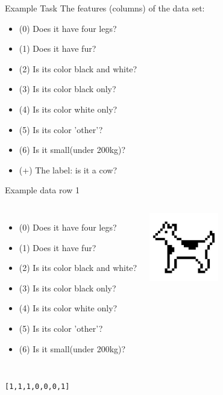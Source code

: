\documentclass[15pt]{beamer}
\begin{document}
\begin{frame}{Example Task}
    The features (columns) of the data set:
    \vspace{2mm}
    \begin{itemize}\itemsep0.5em
        \item (0) Does it have four legs?
        \item (1) Does it have fur?
        \item (2) Is its color black and white?
        \item (3) Is its color black only?
        \item (4) Is its color white only?
        \item (5) Is its color 'other'?
        \item (6) Is it small(under 200kg)?
        \item (+) The label: is it a cow?
    \end{itemize}
\end{frame}


\begin{frame}{Example data row 1}
    \begin{columns}[b]
        \small
        \begin{itemize}\itemsep0.25em
            \item (0) Does it have four legs?
            \item (1) Does it have fur?
            \item (2) Is its color black and white?
            \item (3) Is its color black only?
            \item (4) Is its color white only?
            \item (5) Is its color 'other'?
            \item (6) Is it small(under 200kg)?
        \end{itemize}
        \includegraphics[height=30mm]{img/dog_01.jpg}
    \end{columns}

    \vspace{6mm}
    \normalsize
    \hspace{68mm}\texttt{[1,1,1,0,0,0,1]}
\end{frame}
\end{document}
